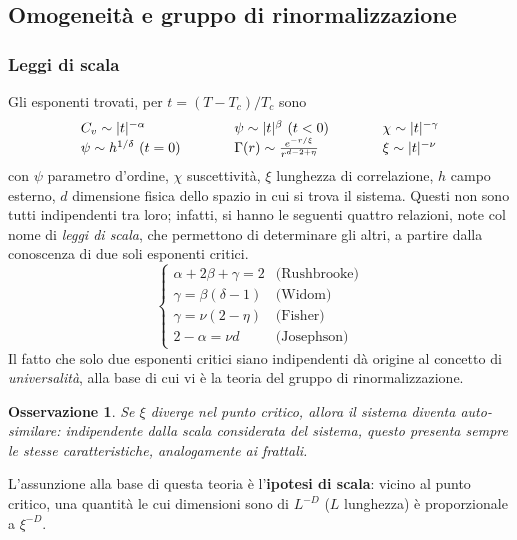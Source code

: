 \documentclass[11pt, a4paper]{scrartcl}
\theoremstyle{style}
\newtheorem{osservazione}{Osservazione}[section]
\theoremstyle{style1}
\newenvironment{boxenv}[1][]{
    \begin{eqbox}[#1]
    }{
   \end{eqbox}
}
\numberwithin{equation}{subsection}
\begin{document}
\subsection{Omogeneit\`a e gruppo di rinormalizzazione}
\subsubsection{Leggi di scala}
Gli esponenti trovati, per $t = (T-T_c)/T_c$ sono
\[
	\begin{array}
		{l l l}
		C_v \sim\lvert t \rvert ^{-\alpha } &\hspace{1cm} \psi \sim\lvert t \rvert ^ \beta \ (t<0) & \hspace{1cm}\chi \sim\lvert t \rvert ^{-\gamma}\\
		\psi \sim h^{1 / \delta } \ (t=0) &\hspace{1cm} \Gamma(r) \sim \frac{e^{-r / \xi }}{r ^{d - 2 + \eta}} &\hspace{1cm} \xi \sim\lvert t \rvert ^{-\nu }
	\end{array}
\] 
con $\psi $ parametro d'ordine, $\chi $ suscettivit\`a, $\xi $ lunghezza di correlazione, $h$ campo esterno, $d$ dimensione fisica dello spazio in cui si trova il sistema.
Questi non sono tutti indipendenti tra loro; infatti, si hanno le seguenti quattro relazioni, note col nome di \textit{leggi di scala}, che permettono di determinare gli altri, a partire dalla conoscenza di due soli esponenti critici.
\[
\begin{cases}
	\alpha  + 2 \beta  + \gamma = 2 & \text{(Rushbrooke)}\\
	\gamma= \beta (\delta -1) &\text{(Widom)}\\
	\gamma = \nu (2-\eta) & \text{(Fisher)}\\
	2 - \alpha  = \nu  d & \text{(Josephson)}
\end{cases}
\] 
Il fatto che solo due esponenti critici siano indipendenti d\`a origine al concetto di \textit{universalit\`a}, alla base di cui vi \`e la teoria del gruppo di rinormalizzazione. 
\begin{osservazione}
Se $\xi $ diverge nel punto critico, allora il sistema diventa \textit{auto-similare}: indipendente dalla scala considerata del sistema, questo presenta sempre le stesse caratteristiche, analogamente ai frattali.
\end{osservazione}
\begin{boxenv}[]
 L'assunzione alla base di questa teoria \`e l'\textbf{ipotesi di scala}: vicino al punto critico, una quantit\`a le cui dimensioni sono di $L ^{-D}$ ($L$ lunghezza) \`e proporzionale a $\xi ^{-D}$.
\end{boxenv}
\end{document}
